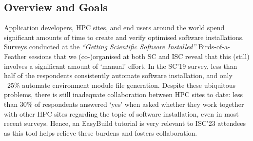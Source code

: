 

\subsection*{Overview and Goals}

Application developers, HPC sites, and end users around the world
spend significant amounts of time to create and verify optimised software installations. Surveys conducted at the
\emph{``Getting Scientific Software Installed''} Birds-of-a-Feather sessions that we (co-)organised at both SC and ISC reveal that this (still) involves a significant amount of `manual' effort.
In the SC'19 survey,
less than half of the respondents consistently automate software installation,
and only ~25\% automate environment module file generation.
Despite these ubiquitous problems,
there is still inadequate collaboration
between HPC sites to date: less than 30\% of respondents answered `yes' when asked whether they
work together with other HPC sites regarding the topic of software installation, even in most recent surveys.
Hence, an EasyBuild tutorial is very relevant to ISC'23 attendees as this tool helps relieve these burdens and fosters collaboration.

